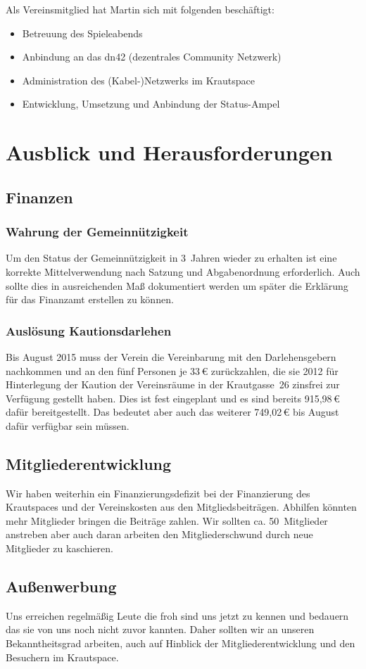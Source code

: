 \documentclass[10pt,DIV16]{scrartcl}
\begin{document}
Als Vereinsmitglied hat Martin sich mit folgenden beschäftigt: 
\begin{itemize}
	\item Betreuung des Spieleabends
	\item Anbindung an das dn42 (dezentrales Community Netzwerk)
	\item Administration des (Kabel-)Netzwerks im Krautspace
	\item Entwicklung, Umsetzung und Anbindung der Status-Ampel
\end{itemize}

\section{Ausblick und Herausforderungen}

\subsection{Finanzen}
\label{sec:ausblick:finanzen}

\subsubsection{Wahrung der Gemeinnützigkeit}
Um den Status der Gemeinnützigkeit in 3~Jahren wieder zu erhalten ist eine korrekte Mittelverwendung nach Satzung und Abgabenordnung erforderlich.
Auch sollte dies in ausreichenden Maß dokumentiert werden um später die Erklärung für das Finanzamt erstellen zu können.

\subsubsection{Auslösung Kautionsdarlehen}
\label{sec:katrionsdarlehen}
Bis August 2015 muss der Verein die Vereinbarung mit den Darlehensgebern nachkommen und an den fünf Personen je 33\,\euro{} zurückzahlen, die sie 2012 für Hinterlegung der Kaution der Vereinsräume in der Krautgasse~26 zinsfrei zur Verfügung gestellt haben.
Dies ist fest eingeplant und es sind bereits 915,98\,\euro{} dafür bereitgestellt.
Das bedeutet aber auch das weiterer 749,02\,\euro{} bis August dafür verfügbar sein müssen.

\subsection{Mitgliederentwicklung}
Wir haben weiterhin ein Finanzierungsdefizit bei der Finanzierung des Krautspaces und der Vereinskosten aus den Mitgliedsbeiträgen.
Abhilfen könnten mehr Mitglieder bringen die Beiträge zahlen.
Wir sollten ca. 50~Mitglieder anstreben aber auch daran arbeiten den Mitgliederschwund durch neue Mitglieder zu kaschieren.

\subsection{Außenwerbung}
Uns erreichen regelmäßig Leute die froh sind uns jetzt zu kennen und bedauern das sie von uns noch nicht zuvor kannten.
Daher sollten wir an unseren Bekanntheitsgrad arbeiten, auch auf Hinblick der Mitgliederentwicklung und den Besuchern im Krautspace.
\end{document}
